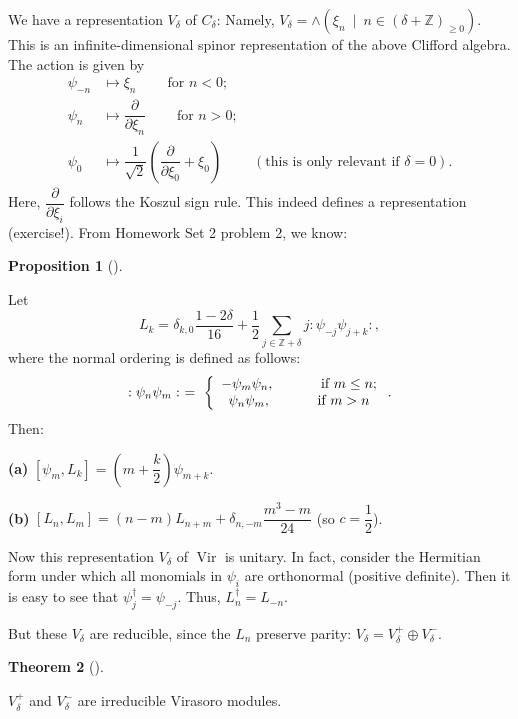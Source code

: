\documentclass
[numbers=enddot,12pt,final,onecolumn,german,notitlepage]{scrartcl}%
\theoremstyle{definition}
\newtheorem{theo}{Theorem}
\newenvironment{theorem}[1][]
{\begin{theo}[#1]\begin{leftbar}}
{\end{leftbar}\end{theo}}
\newtheorem{prop}[theo]{Proposition}
\newenvironment{proposition}[1][]
{\begin{prop}[#1]\begin{leftbar}}
{\end{leftbar}\end{prop}}
\begin{document}
We have a representation $V_{\delta}$ of $C_{\delta}$: Namely, $V_{\delta
}=\wedge\left(  \xi_{n}\ \mid\ n\in\left(  \delta+\mathbb{Z}\right)  _{\geq
0}\right)  $. This is an infinite-dimensional spinor representation of the
above Clifford algebra. The action is given by%
\begin{align*}
\psi_{-n}  &  \mapsto\xi_{n}\ \ \ \ \ \ \ \ \ \ \text{for }n<0;\\
\psi_{n}  &  \mapsto\dfrac{\partial}{\partial\xi_{n}}%
\ \ \ \ \ \ \ \ \ \ \text{for }n>0;\\
\psi_{0}  &  \mapsto\dfrac{1}{\sqrt{2}}\left(  \dfrac{\partial}{\partial
\xi_{0}}+\xi_{0}\right)  \ \ \ \ \ \ \ \ \ \ \left(  \text{this is only
relevant if }\delta=0\right)  .
\end{align*}
Here, $\dfrac{\partial}{\partial\xi_{i}}$ follows the Koszul sign rule. This
indeed defines a representation (exercise!). From Homework Set 2 problem 2, we know:

\begin{proposition}
Let%
\[
L_{k}=\delta_{k,0}\dfrac{1-2\delta}{16}+\dfrac{1}{2}\sum\limits_{j\in
\mathbb{Z}+\delta}j:\psi_{-j}\psi_{j+k}:,
\]
where the normal ordering is defined as follows:%
\[
:\psi_{n}\psi_{m}:\ =\ \left\{
\begin{array}
[c]{c}%
-\psi_{m}\psi_{n},\ \ \ \ \ \ \ \ \ \ \text{if }m\leq n;\\
\psi_{n}\psi_{m},\ \ \ \ \ \ \ \ \ \ \text{if }m>n
\end{array}
\right.  .
\]
Then:

\textbf{(a)} $\left[  \psi_{m},L_{k}\right]  =\left(  m+\dfrac{k}{2}\right)
\psi_{m+k}$.

\textbf{(b)} $\left[  L_{n},L_{m}\right]  =\left(  n-m\right)  L_{n+m}%
+\delta_{n,-m}\dfrac{m^{3}-m}{24}$ (so $c=\dfrac{1}{2}$).
\end{proposition}

Now this representation $V_{\delta}$ of $\operatorname*{Vir}$ is unitary. In
fact, consider the Hermitian form under which all monomials in $\psi_{i}$ are
orthonormal (positive definite). Then it is easy to see that $\psi_{j}^{\dag
}=\psi_{-j}$. Thus, $L_{n}^{\dag}=L_{-n}$.

But these $V_{\delta}$ are reducible, since the $L_{n}$ preserve parity:
$V_{\delta}=V_{\delta}^{+}\oplus V_{\delta}^{-}$.

\begin{theorem}
$V_{\delta}^{+}$ and $V_{\delta}^{-}$ are irreducible Virasoro modules.
\end{theorem}
\end{document}
